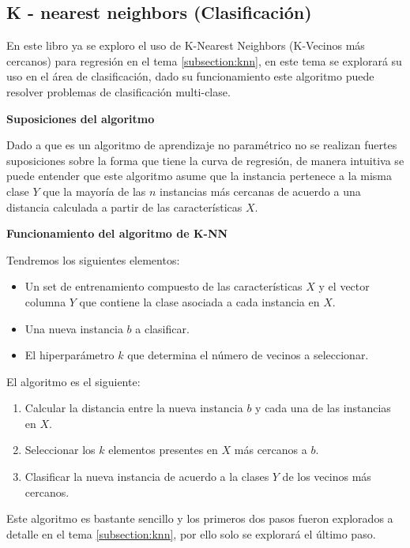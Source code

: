\documentclass[11pt,fleqn]{book} %
\begin{document}
\subsection{K - nearest neighbors (Clasificación)} 
\label{subsection:knn_csn}

En este libro ya se exploro el uso de  K-Nearest Neighbors (K-Vecinos más cercanos) para regresión en el tema \ref{subsection:knn}, en este tema se explorará su uso en el área de clasificación, dado su funcionamiento este algoritmo puede resolver problemas de clasificación multi-clase.

\textbf{Suposiciones del algoritmo}

Dado a que es un algoritmo de aprendizaje no paramétrico no se realizan fuertes suposiciones sobre la forma que tiene la curva de regresión, de manera intuitiva se puede entender que este algoritmo asume que la instancia pertenece a la misma clase $Y$ que la mayoría de las $n$ instancias más cercanas de acuerdo a una distancia calculada a partir de las características $X$.

\textbf{Funcionamiento del algoritmo de K-NN}

Tendremos los siguientes elementos:

\begin{itemize}
\item  Un set de entrenamiento compuesto de las características $X$ y el vector columna $Y$ que contiene la clase asociada a cada instancia en $X$.
\item Una nueva instancia $b$ a clasificar.
\item El hiperparámetro $k$ que determina el número de vecinos a seleccionar.
\end{itemize}

El algoritmo es el siguiente:
\begin{enumerate}
\item Calcular la distancia entre la nueva instancia $b$ y cada una de las instancias en $X$.
\item Seleccionar los $k$ elementos presentes en $X$ más cercanos a $b$.
\item Clasificar la nueva instancia de acuerdo a la clases $Y$ de los vecinos más cercanos.
\end{enumerate}

Este algoritmo es bastante sencillo y los primeros dos pasos fueron explorados a detalle en el tema \ref{subsection:knn}, por ello solo se explorará el último paso.
\end{document}
